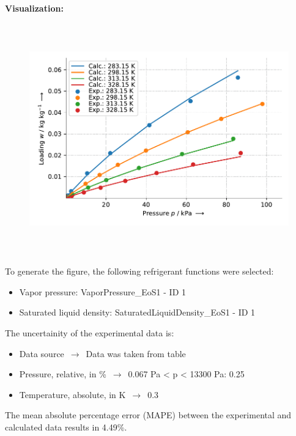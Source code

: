 \textbf{Visualization:}
%
\begin{figure}[!htp]
{\noindent\includegraphics[height=10cm, keepaspectratio]{figs/ads/ads_CarbonDioxide_silica_gel_pellet__Toth_1.pdf}}
\end{figure}
%

To generate the figure, the following refrigerant functions were selected:
\begin{itemize}
\item Vapor pressure: VaporPressure\_EoS1 - ID 1
\item Saturated liquid density: SaturatedLiquidDensity\_EoS1 - ID 1
\end{itemize}

The uncertainity of the experimental data is:
\begin{itemize}
\item Data source $\,\to\,$ Data was taken from table
\item Pressure, relative, in \% $\,\to\,$ 0.067 Pa < p < 13300 Pa: 0.25%
\item Temperature, absolute, in $\si{\kelvin}$ $\,\to\,$ 0.3
\end{itemize}

The mean absolute percentage error (MAPE) between the experimental and calculated data results in 4.49\%.
\FloatBarrier
\newpage
